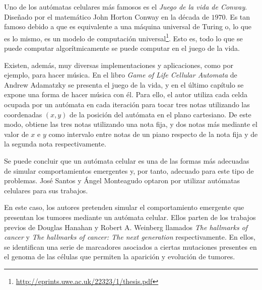 Uno de los autómatas celulares más famosos es el \textit{Juego de la vida de Conway}.
Diseñado por el matemático John Horton Conway en la década de $1970$. Es tan famoso debido a
que es equivalente a una máquina universal de Turing o, lo que es lo mismo, es un modelo de computación universal\footnote{\url{http://eprints.uwe.ac.uk/22323/1/thesis.pdf}}.
Esto es, todo lo que se puede computar algorítmicamente se puede computar en el juego de la vida.

Existen, además, muy diversas implementaciones y aplicaciones, como por ejemplo, para hacer música.
En el libro \textit{Game of Life Cellular Automata} de Andrew Adamatzky \cite{game-of-life} se presenta
el juego de la vida, y en el último capítulo se expone una forma de hacer música con él. Para ello, el autor
utiliza cada celda ocupada por un autómata en cada iteración para tocar tres notas utilizando
las coordenadas $(x,y)$ de la posición del autómata en el plano cartesiano. De este modo,
obtiene las tres notas utilizando una nota fija, y dos notas más mediante el valor de
$x$ e $y$ como intervalo entre notas de un piano respecto de la nota fija y de la segunda nota
respectivamente.

Se puede concluir que un autómata celular es una de las formas más adecuadas de simular comportamientos
emergentes y, por tanto, adecuado para este tipo de problemas. José Santos y
Ángel Monteagudo \cite{jsantos-amonteagudo-1-2014} optaron por utilizar autómatas celulares para sus trabajos.

En este caso, los autores pretenden simular el comportamiento emergente que presentan los
tumores mediante un autómata celular. Ellos parten de los trabajos previos de Douglas Hanahan y Robert A. Weinberg
llamados \textit{The hallmarks of cancer} \cite{hanahan-weinberg-2000} y \textit{The hallmarks of cancer: The next generation} \cite{hanahan-weinberg-2011}
respectivamente. En ellos, se identifican una serie de marcadores asociados a ciertas mutaciones presentes
en el genoma de las células que permiten la aparición y evolución de tumores.
